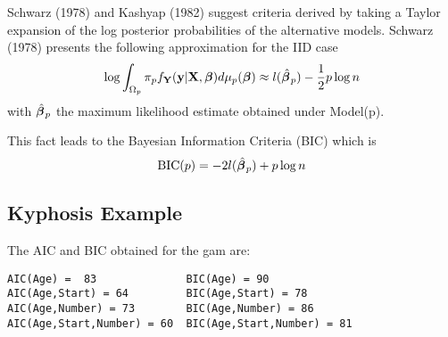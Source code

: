 Schwarz (1978) \nocite{schw:1978} and Kashyap (1982)
\nocite{kash:1982} suggest criteria derived 
by taking a Taylor expansion of the log posterior probabilities of the 
alternative models. Schwarz (1978) \nocite{schw:1978} presents the following
approximation for the IID case
\[
\log \int_{\Omega_p} \pi_p f_{{\mathbf Y}}({\mathbf y}|{\mathbf X},\mbox{\boldmath $\beta$\unboldmath}) d\mu_p(\mbox{\boldmath $\beta$\unboldmath})
\approx  l(\hat{\mbox{\boldmath $\beta$\unboldmath}\:}\!_{p}) - \frac{1}{2} p
\log n 
\] 
with $\hat{\mbox{\boldmath $\beta$\unboldmath}\:}\!_p$ the maximum likelihood estimate obtained under Model(p).

This fact leads to the Bayesian Information Criteria (BIC) which is
\begin{equation}
\label{BIC}
\mbox{BIC}(p) = - 2 l(\hat{\mbox{\boldmath $\beta$\unboldmath}\:}\!_{p}) + p\log n
\end{equation}


\subsection{Kyphosis Example}
The AIC
and BIC obtained for the gam are: 


\begin{verbatim}
AIC(Age) =  83              BIC(Age) = 90
AIC(Age,Start) = 64         BIC(Age,Start) = 78
AIC(Age,Number) = 73        BIC(Age,Number) = 86
AIC(Age,Start,Number) = 60  BIC(Age,Start,Number) = 81
\end{verbatim}  
